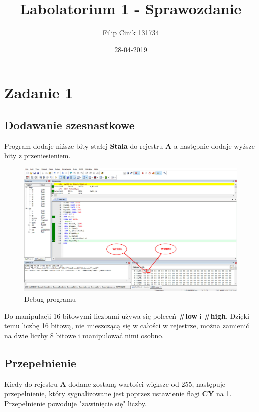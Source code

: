 \documentclass{article}
\title{Labolatorium 1 - Sprawozdanie}
\date{28-04-2019}
\author{Filip Cinik 131734}
\begin{document}
\maketitle
\tableofcontents
\newpage

\section{Zadanie 1}
\subsection{Dodawanie szesnastkowe}
Program dodaje niższe bity stałej \textbf{Stala} do rejestru  \textbf{A} a następnie dodaje wyższe bity z przeniesieniem.

\begin{figure}[!htb]
  \includegraphics[width=\linewidth]{Fig2.jpg}
  \caption{Debug programu}
  \label{fig:fig2}
\end{figure}

Do manipulacji 16 bitowymi liczbami używa się poleceń \textbf{\#low} i \textbf{\#high}. Dzięki temu liczbę 16 bitową, nie mieszczącą się w całości w rejestrze, można zamienić na dwie liczby 8 bitowe i manipulować nimi osobno.

\subsection{Przepełnienie}

Kiedy do rejestru \textbf{A} dodane zostaną wartości większe od 255, następuje przepełnienie, który sygnalizowane jest poprzez ustawienie flagi \textbf{CY} na 1. Przepełnienie powoduje "zawinięcie się" liczby.
\end{document}
